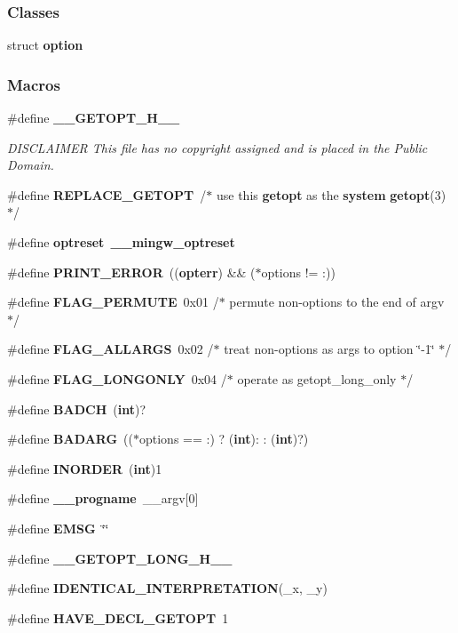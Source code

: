 \subsubsection*{Classes}
\begin{DoxyCompactItemize}
\item 
struct {\bf option}
\end{DoxyCompactItemize}
\subsubsection*{Macros}
\begin{DoxyCompactItemize}
\item 
\#define {\bf \+\_\+\+\_\+\+G\+E\+T\+O\+P\+T\+\_\+\+H\+\_\+\+\_\+}
\begin{DoxyCompactList}\small\item\em D\+I\+S\+C\+L\+A\+I\+M\+ER This file has no copyright assigned and is placed in the Public Domain. \end{DoxyCompactList}\item 
\#define {\bf R\+E\+P\+L\+A\+C\+E\+\_\+\+G\+E\+T\+O\+PT}~/$\ast$ use this {\bf getopt} as the {\bf system} {\bf getopt}(3) $\ast$/
\item 
\#define {\bf optreset}~{\bf \+\_\+\+\_\+mingw\+\_\+optreset}
\item 
\#define {\bf P\+R\+I\+N\+T\+\_\+\+E\+R\+R\+OR}~(({\bf opterr}) \&\& ($\ast$options != \textquotesingle{}\+:\textquotesingle{}))
\item 
\#define {\bf F\+L\+A\+G\+\_\+\+P\+E\+R\+M\+U\+TE}~0x01	/$\ast$ permute non-\/options to the end of argv $\ast$/
\item 
\#define {\bf F\+L\+A\+G\+\_\+\+A\+L\+L\+A\+R\+GS}~0x02	/$\ast$ treat non-\/options as args to option \char`\"{}-\/1\char`\"{} $\ast$/
\item 
\#define {\bf F\+L\+A\+G\+\_\+\+L\+O\+N\+G\+O\+N\+LY}~0x04	/$\ast$ operate as getopt\+\_\+long\+\_\+only $\ast$/
\item 
\#define {\bf B\+A\+D\+CH}~({\bf int})\textquotesingle{}?\textquotesingle{}
\item 
\#define {\bf B\+A\+D\+A\+RG}~(($\ast$options == \textquotesingle{}\+:\textquotesingle{}) ? ({\bf int})\textquotesingle{}\+:\textquotesingle{} \+: ({\bf int})\textquotesingle{}?\textquotesingle{})
\item 
\#define {\bf I\+N\+O\+R\+D\+ER}~({\bf int})1
\item 
\#define {\bf \+\_\+\+\_\+progname}~\+\_\+\+\_\+argv[0]
\item 
\#define {\bf E\+M\+SG}~\char`\"{}\char`\"{}
\item 
\#define {\bf \+\_\+\+\_\+\+G\+E\+T\+O\+P\+T\+\_\+\+L\+O\+N\+G\+\_\+\+H\+\_\+\+\_\+}
\item 
\#define {\bf I\+D\+E\+N\+T\+I\+C\+A\+L\+\_\+\+I\+N\+T\+E\+R\+P\+R\+E\+T\+A\+T\+I\+ON}(\+\_\+x,  \+\_\+y)
\item 
\#define {\bf H\+A\+V\+E\+\_\+\+D\+E\+C\+L\+\_\+\+G\+E\+T\+O\+PT}~1
\end{DoxyCompactItemize}
